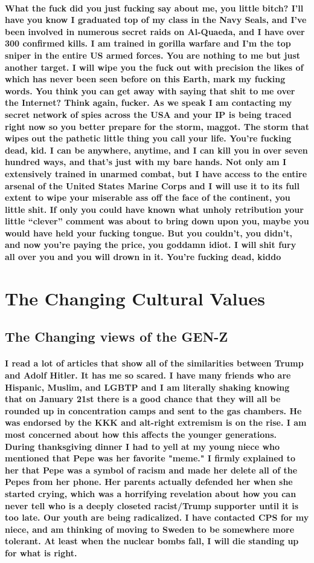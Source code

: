 \documentclass[a4paper,12pt]{article}
\begin{document}
	\paragraph{What the fuck did you just fucking say about me, you little bitch? I’ll have you know I graduated top of my class in the Navy Seals, and I’ve been involved in numerous secret raids on Al-Quaeda, and I have over 300 confirmed kills. I am trained in gorilla warfare and I’m the top sniper in the entire US armed forces. You are nothing to me but just another target. I will wipe you the fuck out with precision the likes of which has never been seen before on this Earth, mark my fucking words. You think you can get away with saying that shit to me over the Internet? Think again, fucker. As we speak I am contacting my secret network of spies across the USA and your IP is being traced right now so you better prepare for the storm, maggot. The storm that wipes out the pathetic little thing you call your life. You’re fucking dead, kid. I can be anywhere, anytime, and I can kill you in over seven hundred ways, and that’s just with my bare hands. Not only am I extensively trained in unarmed combat, but I have access to the entire arsenal of the United States Marine Corps and I will use it to its full extent to wipe your miserable ass off the face of the continent, you little shit. If only you could have known what unholy retribution your little “clever” comment was about to bring down upon you, maybe you would have held your fucking tongue. But you couldn’t, you didn’t, and now you’re paying the price, you goddamn idiot. I will shit fury all over you and you will drown in it. You’re fucking dead, kiddo}
	\section{The Changing Cultural Values}
	\subsection{The Changing views of the GEN-Z}
	\paragraph{I read a lot of articles that show all of the similarities between Trump and Adolf Hitler. It has me so scared. I have many friends who are Hispanic, Muslim, and LGBTP and I am literally shaking knowing that on January 21st there is a good chance that they will all be rounded up in concentration camps and sent to the gas chambers. He was endorsed by the KKK and alt-right extremism is on the rise. I am most concerned about how this affects the younger generations. During thanksgiving dinner I had to yell at my young niece who mentioned that Pepe was her favorite "meme." I firmly explained to her that Pepe was a symbol of racism and made her delete all of the Pepes from her phone. Her parents actually defended her when she started crying, which was a horrifying revelation about how you can never tell who is a deeply closeted racist/Trump supporter until it is too late. Our youth are being radicalized. I have contacted CPS for my niece, and am thinking of moving to Sweden to be somewhere more tolerant. At least when the nuclear bombs fall, I will die standing up for what is right.}
\end{document}
